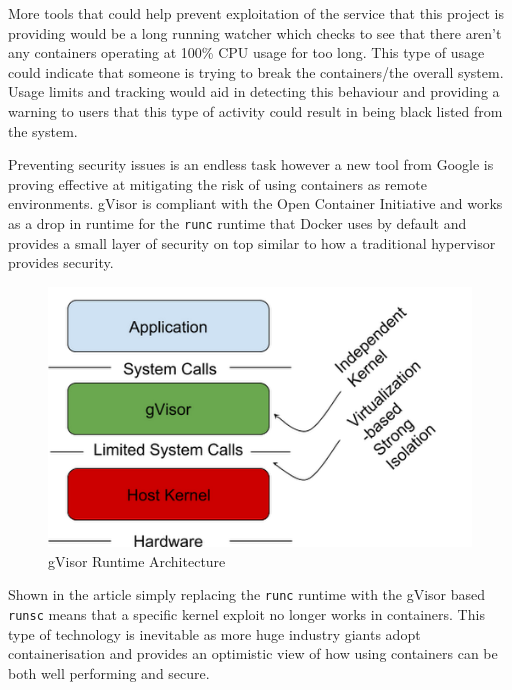 More tools that could help prevent exploitation of the service that this project is providing would be a long running watcher which checks to see that there aren't any containers operating at 100\% CPU usage for too long. This type of usage could indicate that someone is trying to break the containers/the overall system. Usage limits and tracking would aid in detecting this behaviour and providing a warning to users that this type of activity could result in being black listed from the system.

Preventing security issues is an endless task however a new tool from Google is proving effective at mitigating the risk of using containers as remote environments. gVisor \cite{gvisor} is compliant with the Open Container Initiative and works as a drop in runtime for the \texttt{runc} runtime that Docker uses by default and provides a small layer of security on top similar to how a traditional hypervisor provides security.

\begin{figure}[h!]
    \centering
    \includegraphics[scale=0.5]{res/gvisor.PNG}
    \caption{gVisor Runtime Architecture \cite{gvisor-info}}
    \label{fig:gvisor}
\end{figure}

Shown in the article \cite{gvisor-info} simply replacing the \texttt{runc} runtime with the gVisor based \texttt{runsc} means that a specific kernel exploit no longer works in containers. This type of technology is inevitable as more huge industry giants adopt containerisation and provides an optimistic view of how using containers can be both well performing and secure.

\pagebreak
